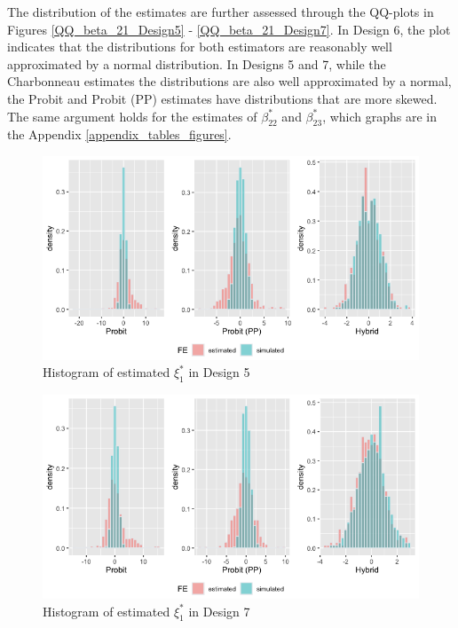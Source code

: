 The distribution of the estimates are further assessed through the QQ-plots in Figures \ref{QQ_beta_21_Design5} - \ref{QQ_beta_21_Design7}. In Design 6, the plot indicates that the distributions for both estimators are reasonably well approximated by a normal distribution. In Designs 5 and 7, while the Charbonneau estimates the distributions are also well approximated by a normal, the Probit and Probit (PP) estimates have distributions that are more skewed. The same argument holds for the estimates of $\beta_{22}^*$ and $\beta_{23}^*$, which graphs are in the Appendix \ref{appendix_tables_figures}.
\begin{figure}
  \vspace{-2.5em}%
  \centerline{\includegraphics[scale=.45]{content/Figures/Hist_FE_Design5.png}}
  \caption{\footnotesize{Histogram of estimated $\xi_1^*$ in Design 5}}
  \label{fig}
\end{figure}
\begin{figure}
  \vspace{-2.5em}%
  \centerline{\includegraphics[scale=.45]{content/Figures/Hist_FE_Design7.png}}
  \caption{\footnotesize{Histogram of estimated $\xi_1^*$ in Design 7}}
  \label{fig}
\end{figure}

